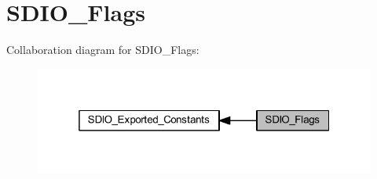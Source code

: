 \hypertarget{group___s_d_i_o___flags}{}\section{S\+D\+I\+O\+\_\+\+Flags}
\label{group___s_d_i_o___flags}
Collaboration diagram for S\+D\+I\+O\+\_\+\+Flags\+:
\nopagebreak
\begin{figure}[H]
\begin{center}
\leavevmode
\includegraphics[width=319pt]{group___s_d_i_o___flags}
\end{center}
\end{figure}
